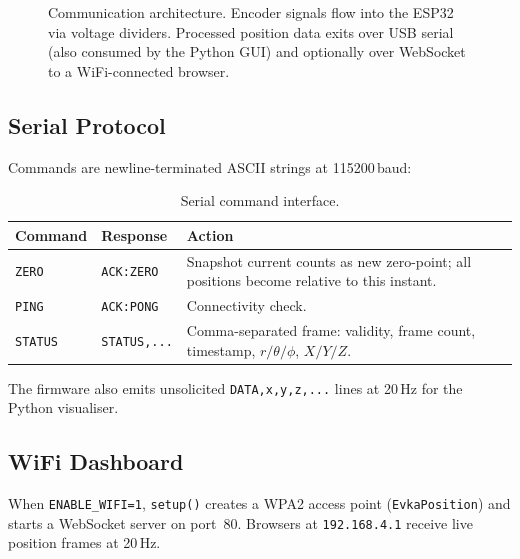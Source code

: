 \documentclass[11pt,a4paper]{article}
\begin{document}
\begin{figure}[h]
\caption{Communication architecture.  Encoder signals flow into the ESP32 via
voltage dividers.  Processed position data exits over USB serial (also consumed
by the Python GUI) and optionally over WebSocket to a WiFi-connected browser.}
\label{fig:comms}
\end{figure}

\subsection{Serial Protocol}

Commands are newline-terminated ASCII strings at 115200\,baud:

\renewcommand{\arraystretch}{1.3}
\begin{table}[h]
\centering
\caption{Serial command interface.}
\label{tab:serial}
\begin{tabularx}{\textwidth}{@{}llX@{}}
\toprule
\textbf{Command} & \textbf{Response} & \textbf{Action} \\
\midrule
\texttt{ZERO}   & \texttt{ACK:ZERO}   & Snapshot current counts as new
                                         zero-point; all positions become
                                         relative to this instant. \\
\texttt{PING}   & \texttt{ACK:PONG}   & Connectivity check. \\
\texttt{STATUS} & \texttt{STATUS,...} & Comma-separated frame: validity,
                                         frame count, timestamp,
                                         \(r/\theta/\phi\), \(X/Y/Z\). \\
\bottomrule
\end{tabularx}
\end{table}

The firmware also emits unsolicited \texttt{DATA,x,y,z,...} lines at
20\,Hz for the Python visualiser.

\subsection{WiFi Dashboard}

When \texttt{ENABLE\_WIFI=1}, \texttt{setup()} creates a WPA2 access
point (\texttt{EvkaPosition}) and starts a WebSocket server on port~80.
Browsers at \texttt{192.168.4.1} receive live position frames at 20\,Hz.
\end{document}
